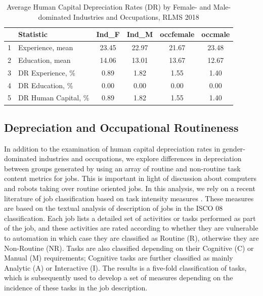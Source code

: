 \documentclass[alpha-refs]{wiley-article-02b}
\begin{document}
\begin{table}[htbp!]
	\centering 
	\caption{Average Human Capital Depreciation Rates (DR) by Female- and Male-dominated Industries and Occupations, RLMS 2018} 
	\label{tab:2.3} 
	\begin{tabular}{clcccc}
		\hline
		& \textbf{Statistic} &\textbf{Ind\_F}& \textbf{Ind\_M} & \textbf{occfemale} & \textbf{occmale} \\ 
		\hline
		1 & Experience, mean  & 23.45 & 22.97 & 21.67 & 23.48 \\ 
		2 & Education, mean & 14.06 & 13.01 & 13.67 & 12.67 \\ 
		\midrule
		3 & DR Experience, \% & 0.89 & 1.82 & 1.55 & 1.40 \\ 
		4 & DR Education, \% & 0.00 & 0.00 & 0.00 & 0.00 \\ 
		5 & DR Human Capital, \% & 0.89 & 1.82 & 1.55 & 1.40 \\ 
		\hline
	\end{tabular}
\end{table} 


\subsection{Depreciation and Occupational Routineness}

In addition to the examination of human capital depreciation rates in 
gender-dominated industries and occupations, we explore differences in 
depreciation  between groups generated by using an array of routine and 
non-routine task content metrics for jobs. This is important in light of 
discussion about computers and robots taking over routine oriented jobs. In 
this analysis, we rely on a recent literature of job classification based 
on task intensity measures  \citet{Mihaylov_2019}. These measures are based 
on the textual analysis of description of jobs in the ISCO 08 
classification. Each job lists a detailed set of activities or tasks 
performed as part of the job, and these activities are rated according to 
whether they are vulnerable to automation in which case they are classified 
as Routine (R), otherwise they are Non-Routine (NR). Tasks are also 
classified depending on their Cognitive (C) or Manual (M) requirements; 
Cognitive tasks are further classified as mainly Analytic (A) or 
Interactive (I). The results is a five-fold classification of tasks, which 
is subsequently used to develop a set of measures depending on the 
incidence of these tasks in the job description.
\end{document}
